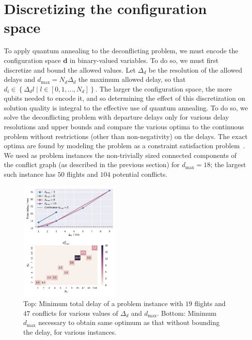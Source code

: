 \section{Discretizing the configuration space}
To apply quantum annealing to the deconflicting problem, we must encode the configuration space $\mathbf d$ in binary-valued variables.
To do so, we must first discretize and bound the allowed values.
Let $\Delta_d$ be the resolution of the allowed delays and $d_{\max} = N_d \Delta_d$ the maximum allowed delay, so that $d_i \in \left\{\Delta_d l \middle| l \in [0, 1, \ldots, N_d]\right\}$.
The larger the configuration space, the more qubits needed to encode it, and so determining the effect of this discretization on solution quality is integral to the effective use of quantum annealing.
To do so, we solve the deconflicting problem with departure delays only for various delay resolutions and upper bounds and compare the various optima to the continuous problem without restrictions (other than non-negativity) on the delays.
The exact optima are found by modeling the problem as a constraint satisfaction problem~\cite{numberjack}. 
We used as problem instances the non-trivially sized connected components of the conflict graph (as described in the previous section) for $d_{\max} = 18$; the largest such instance has $50$ flights and $104$ potential conflicts.

\begin{figure}[h]
\centering
\includegraphics[width=0.45\textwidth]{./pics/delay_only_cp_results.pdf}
\caption[Effect of discretization on solution quality]{Top: Minimum total delay of a problem instance with $19$ flights and $47$ conflicts for various values of $\Delta_d$ and $d_{\max}$.
Bottom: Minimum $d_\text{max}$ necessary to obtain same optimum as that without bounding the delay, for various instances.}
\label{fig:delay_only_cp_results}
\end{figure}

